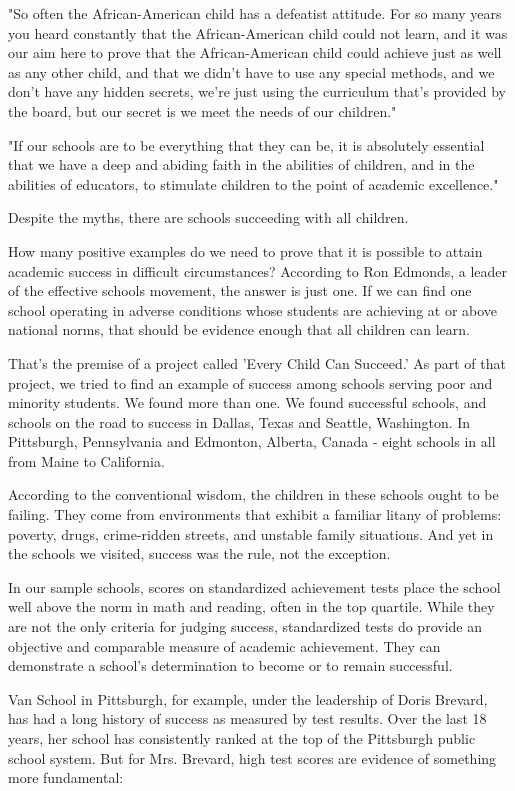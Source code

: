 "So often the African-American child has a defeatist attitude.
For so many years you heard constantly that the African-American child could not learn, and it was our aim here to prove that the African-American child could achieve just as well as any other child, and that we didn't have to use any special methods, and we don't have any hidden secrets, we're just using the curriculum that's provided by the board, but our secret is we meet the needs of our children."

"If our schools are to be everything that they can be, it is absolutely essential that we have a deep and abiding faith in the abilities of children, and in the abilities of educators, to stimulate children to the point of academic excellence."

Despite the myths, there are schools succeeding with all children.

How many positive examples do we need to prove that it is possible to attain academic success in difficult circumstances?
According to Ron Edmonds, a leader of the effective schools movement, the answer is just one.
If we can find one school operating in adverse conditions whose students are achieving at or above national norms, that should be evidence enough that all children can learn.

That's the premise of a project called 'Every Child Can Succeed.'
As part of that project, we tried to find an example of success among schools serving poor and minority students.
We found more than one.
We found successful schools, and schools on the road to success in Dallas, Texas and Seattle, Washington.
In Pittsburgh, Pennsylvania and Edmonton, Alberta, Canada - eight schools in all from Maine to California.

According to the conventional wisdom, the children in these schools ought to be failing.
They come from environments that exhibit a familiar litany of problems: poverty, drugs, crime-ridden streets, and unstable family situations.
And yet in the schools we visited, success was the rule, not the exception.

In our sample schools, scores on standardized achievement tests place the school well above the norm in math and reading, often in the top quartile.
While they are not the only criteria for judging success, standardized tests do provide an objective and comparable measure of academic achievement.
They can demonstrate a school's determination to become or to remain successful.

Van School in Pittsburgh, for example, under the leadership of Doris Brevard, has had a long history of success as measured by test results.
Over the last 18 years, her school has consistently ranked at the top of the Pittsburgh public school system.
But for Mrs. Brevard, high test scores are evidence of something more fundamental:


